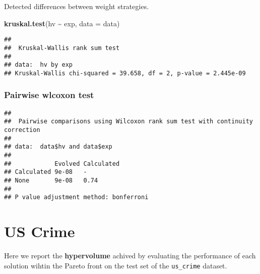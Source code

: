 \documentclass[
]{book}
\newenvironment{Shaded}{\begin{snugshade}}{\end{snugshade}}
\newcommand{\AttributeTok}[1]{\textcolor[rgb]{0.13,0.29,0.53}{#1}}
\newcommand{\ConstantTok}[1]{\textcolor[rgb]{0.56,0.35,0.01}{#1}}
\newcommand{\FunctionTok}[1]{\textcolor[rgb]{0.13,0.29,0.53}{\textbf{#1}}}
\newcommand{\NormalTok}[1]{#1}
\newcommand{\SpecialCharTok}[1]{\textcolor[rgb]{0.81,0.36,0.00}{\textbf{#1}}}
\newcommand{\StringTok}[1]{\textcolor[rgb]{0.31,0.60,0.02}{#1}}
\begin{document}
Detected differences between weight strategies.

\begin{Shaded}
\begin{Highlighting}[]
\FunctionTok{kruskal.test}\NormalTok{(hv }\SpecialCharTok{\textasciitilde{}}\NormalTok{ exp, }\AttributeTok{data =}\NormalTok{ data)}
\end{Highlighting}
\end{Shaded}

\begin{verbatim}
## 
##  Kruskal-Wallis rank sum test
## 
## data:  hv by exp
## Kruskal-Wallis chi-squared = 39.658, df = 2, p-value = 2.445e-09
\end{verbatim}

\hypertarget{pairwise-wlcoxon-test-4}{%
\subsection{Pairwise wlcoxon test}\label{pairwise-wlcoxon-test-4}}

\begin{Shaded}
\end{Shaded}

\begin{verbatim}
## 
##  Pairwise comparisons using Wilcoxon rank sum test with continuity correction 
## 
## data:  data$hv and data$exp 
## 
##            Evolved Calculated
## Calculated 9e-08   -         
## None       9e-08   0.74      
## 
## P value adjustment method: bonferroni
\end{verbatim}

\hypertarget{us-crime}{%
\chapter{US Crime}\label{us-crime}}

Here we report the \textbf{hypervolume} achived by evaluating the performance of each solution wihtin the Pareto front on the test set of the \texttt{us\_crime} dataset.
\end{document}

